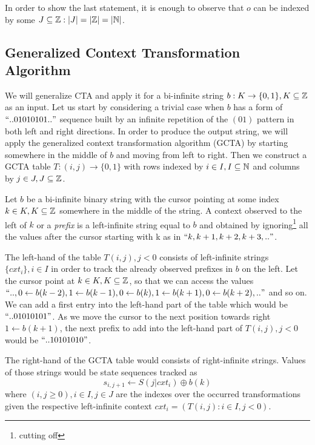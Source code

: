 In order to show the last statement, it is enough to observe that $o$ can be indexed by some $J \subseteq \mathbb{Z}: |J| = |\mathbb{Z}| = |\mathbb{N}|$.

\subsection{Generalized Context Transformation Algorithm}\label{subsec_gcta}

We will generalize CTA and apply it for a bi-infinite string $b: K \to \{0,1\}, K \subseteq \mathbb{Z}$  as an input. Let us start by considering a trivial case when $b$ has a form of $\text{``}..01010101..\text{''}$ sequence built by an infinite repetition of the $(01)$ pattern in both left and right directions. In order to produce the output string, we will apply the generalized context transformation algorithm (GCTA) by starting somewhere in the middle of $b$ and moving from left to right. Then we construct a GCTA table $T: (i,j) \to \{0,1\}$ with rows indexed by $i \in I, I \subseteq \mathbb{N}$ and columns by $j \in J, J \subseteq \mathbb{Z}$.

\begin{definition}Let $b$ be a bi-infinite binary string with the cursor pointing at some index $k \in K, K \subseteq \mathbb{Z}$ somewhere in the middle of the string. A context observed to the left of $k$ or a \textit{prefix} is a left-infinite string equal to $b$ and obtained by ignoring\footnote{cutting off} all the values after the cursor starting with k as in $\text{``} k, k+1, k+2, k+3, ..\text{''}$.\end{definition}

The left-hand of the table $T(i,j), j < 0$ consists of left-infinite strings $\{cxt_i\}, i \in I$ in order to track the already observed prefixes in $b$ on the left. Let the cursor point at $k \in K, K \subseteq \mathbb{Z}$, so that we can access the values $\text{``}..,0 \leftarrow b(k-2), 1 \leftarrow b(k-1), 0 \leftarrow b(k), 1 \leftarrow b(k+1), 0 \leftarrow b(k+2),..\text{''}$ and so on. We can add a first entry into the left-hand part of the table which would be  $\text{``}..01010101\text{''}$. As we move the cursor to the next position towards right $1 \leftarrow b(k+1)$, the next prefix to add into the left-hand part of $T(i,j), j < 0$ would be $\text{``}..10101010\text{''}$. 

The right-hand of the GCTA table would consists of right-infinite strings. Values of those strings would be state sequences tracked as 
\begin{equation}s_{i,j + 1} \leftarrow S(j|cxt_i) \oplus b(k)\end{equation} 
where $(i,j \geq 0), i \in I, j \in J$ are the indexes over the occurred transformations given the respective left-infinite context $cxt_i = (T(i, j): i \in I, j < 0)$. 

